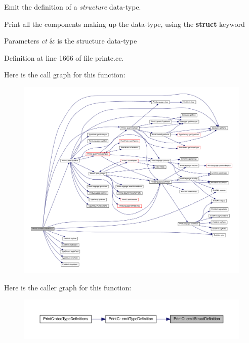 Emit the definition of a {\itshape structure} data-\/type. 

Print all the components making up the data-\/type, using the {\bfseries{struct}} keyword 
\begin{DoxyParams}{Parameters}
{\em ct} & is the structure data-\/type \\
\hline
\end{DoxyParams}


Definition at line 1666 of file printc.\+cc.

Here is the call graph for this function\+:
\nopagebreak
\begin{figure}[H]
\begin{center}
\leavevmode
\includegraphics[width=350pt]{class_print_c_a680ec03cb56eb70c13c4d1ee261cdda9_cgraph}
\end{center}
\end{figure}
Here is the caller graph for this function\+:
\nopagebreak
\begin{figure}[H]
\begin{center}
\leavevmode
\includegraphics[width=350pt]{class_print_c_a680ec03cb56eb70c13c4d1ee261cdda9_icgraph}
\end{center}
\end{figure}
\mbox{\label{class_print_c_afe955f74fd15f96204c3060ea22ea080}} 
